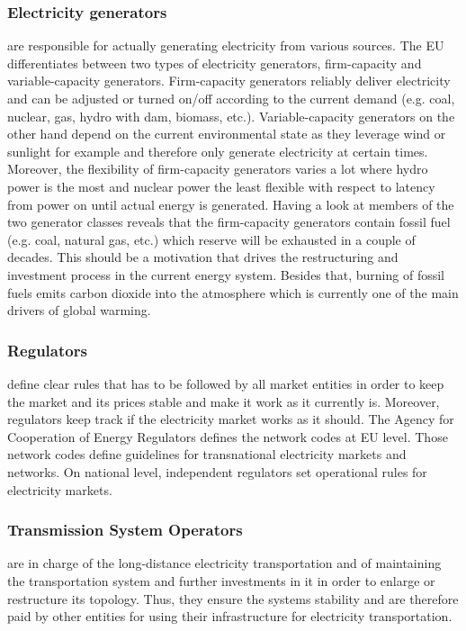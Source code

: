 \documentclass[runningheads]{llncs}
\begin{document}
\subsubsection{Electricity generators} are responsible for actually generating electricity from various sources. The EU differentiates between two types of electricity generators, firm-capacity and variable-capacity generators. Firm-capacity generators reliably deliver electricity and can be adjusted or turned on/off according to the current demand (e.g. coal, nuclear, gas, hydro with dam, biomass, etc.). Variable-capacity generators on the other hand depend on the current environmental state as they leverage wind or sunlight for example and therefore only generate electricity at certain times.  Moreover, the flexibility of firm-capacity generators varies a lot where hydro power is the most and nuclear power the least flexible with respect to latency from power on until actual energy is generated.
Having a look at members of the two generator classes reveals that the firm-capacity generators contain fossil fuel (e.g. coal, natural gas, etc.) which reserve will be exhausted in a couple of decades. This should be a motivation that drives the restructuring and investment process in the current energy system. Besides that, burning of fossil fuels emits carbon dioxide into the atmosphere which is currently one of the main drivers of global warming. \cite{eu_energy_market}

\subsubsection{Regulators} define clear rules that has to be followed by all market entities in order to keep the market and its prices stable and make it work as it currently is. Moreover, regulators keep track if the electricity market works as it should. The Agency for Cooperation of Energy Regulators defines the network codes at EU level. Those network codes define guidelines for transnational electricity markets and networks. On national level, independent regulators set operational rules for electricity markets.

\subsubsection{Transmission System Operators} are in charge of the long-distance electricity transportation and of maintaining the transportation system and further investments in it in order to enlarge or restructure its topology. Thus, they ensure the systems stability and are therefore paid by other entities for using their infrastructure for electricity transportation.
\end{document}
